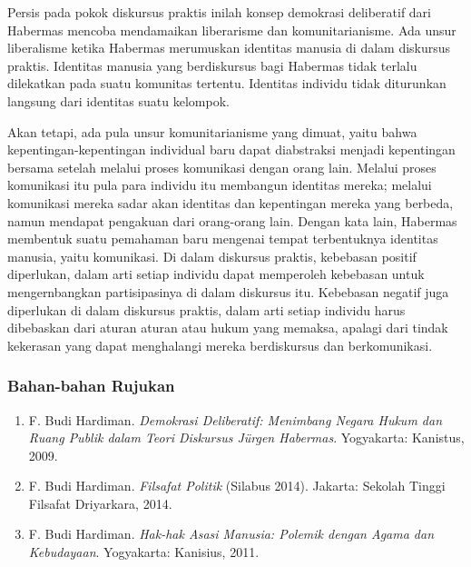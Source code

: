 \documentclass[10pt,a4paper]{article}
\def\tightlist{}
\begin{document}
\begin{multicols}{2}
\begin{itemize}
  Persis pada pokok diskursus praktis inilah konsep demokrasi
  deliberatif dari Habermas mencoba mendamaikan liberarisme dan
  komunitarianisme. Ada unsur liberalisme ketika Habermas merumuskan
  identitas manusia di dalam diskursus praktis. Identitas manusia yang
  berdiskursus bagi Habermas tidak terlalu dilekatkan pada suatu
  komunitas tertentu. Identitas individu tidak diturunkan langsung dari
  identitas suatu kelompok.

  Akan tetapi, ada pula unsur komunitarianisme yang dimuat, yaitu bahwa
  kepentingan-kepentingan individual baru dapat diabstraksi menjadi
  kepentingan bersama setelah melalui proses komunikasi dengan orang
  lain. Melalui proses komunikasi itu pula para individu itu membangun
  identitas mereka; melalui komunikasi mereka sadar akan identitas dan
  kepentingan mereka yang berbeda, namun mendapat pengakuan dari
  orang-orang lain. Dengan kata lain, Habermas membentuk suatu pemahaman
  baru mengenai tempat terbentuknya identitas manusia, yaitu komunikasi.
  Di dalam diskursus praktis, kebebasan positif diperlukan, dalam arti
  setiap individu dapat memperoleh kebebasan untuk mengernbangkan
  partisipasinya di dalam diskursus itu. Kebebasan negatif juga
  diperlukan di dalam diskursus praktis, dalam arti setiap individu
  harus dibebaskan dari aturan aturan atau hukum yang memaksa, apalagi
  dari tindak kekerasan yang dapat menghalangi mereka berdiskursus dan
  berkomunikasi.
\end{itemize}

\hypertarget{bahan-bahan-rujukan-2}{%
\subsubsection{Bahan-bahan Rujukan}\label{bahan-bahan-rujukan-2}}

\begin{enumerate}
\def\labelenumi{\arabic{enumi}.}
\tightlist
\item
  F. Budi Hardiman. \emph{Demokrasi Deliberatif: Menimbang Negara Hukum
  dan} \emph{Ruang Publik dalam Teori Diskursus Jürgen Habermas}.
  Yogyakarta: Kanistus, 2009.
\item
  F. Budi Hardiman. \emph{Filsafat Politik} (Silabus 2014). Jakarta:
  Sekolah Tinggi Filsafat Driyarkara, 2014.
\item
  F. Budi Hardiman. \emph{Hak-hak Asasi Manusia: Polemik dengan Agama
  dan} \emph{Kebudayaan}. Yogyakarta: Kanisius, 2011.
\end{enumerate}


\end{multicols}
\end{document}
